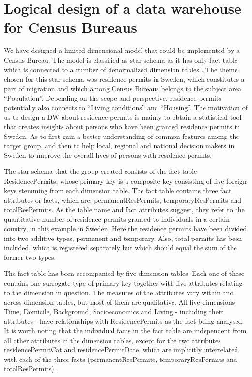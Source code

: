 \section{Logical design of a data warehouse for Census Bureaus}
We have designed a limited dimensional model that could be implemented by a Census Bureau. 
The model is classified as star schema as it has only fact table which is connected to a number 
of denormalized dimension tables \cite[chapter~32.4]{CourseLitt}. The theme chosen for this star schema was 
residence permits in Sweden, which constitutes a part of migration and which among Census Bureaus 
belongs to the subject area “Population”. Depending on the scope and perspective, residence permits 
potentially also connects to “Living conditions” and “Housing”. The motivation of us to design a DW 
about residence permits is mainly to obtain a statistical tool that creates insights about persons 
who have been granted residence permits in Sweden. As to first gain a better understanding of common 
features among the target group, and then to help local, regional and national decision makers in 
Sweden to improve the overall lives of persons with residence permits. 

The star schema that the group created consists of the fact table ResidencePermits, whose primary 
key is a composite key consisting of five foreign keys stemming from each dimension table. The fact 
table contains three fact attributes or facts, which are: permanentResPermits, temporaryResPermits and 
totalResPermits. As the table name and fact attributes suggest, they refer to the quantitative number 
of residence permits granted to individuals in a certain country, in this example in Sweden. Here the 
residence permits have been divided into two additive types, permanent and temporary. Also, total 
permits has been included, which is registered separately but which should equal the sum of the former two types. 

The fact table has been accompanied by five dimension tables. Each one of these contains one surrogate 
type of primary key together with five attributes relating to the dimension in question. The measures 
of the attributes vary within and across dimension tables, but most of them are qualitative. All five 
dimensions Time, Domicile, Background, Socioeconomics and Living - including their attributes - have 
relationships with ResidencePermits as the fact being analysed. It is worth noting that the individual 
facts in the fact table are independent from all other attributes in the dimension tables, except for the 
two attributes residencePermitCat and residencePermitDate, which are implicitly interrelated with each of 
the three facts (permanentResPermits, temporaryResPermits and totalResPermits). 
\newpage
